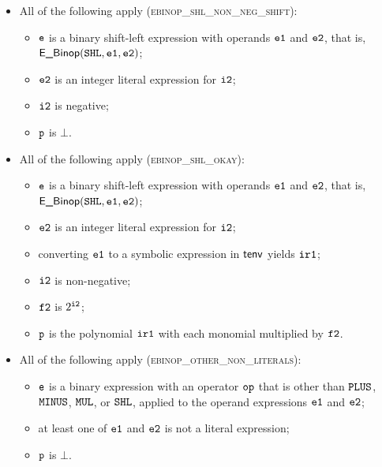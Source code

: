 \documentclass{book}
\begin{document}
\begin{itemize}
  \item All of the following apply (\textsc{ebinop\_shl\_non\_neg\_shift}):
  \begin{itemize}
    \item $\texttt{e}$ is a binary shift-left expression with operands $\texttt{e1}$ and $\texttt{e2}$, that is, \\ $\textsf{E\_Binop}(\texttt{SHL}, \texttt{e1}, \texttt{e2})$;
    \item $\texttt{e2}$ is an integer literal expression for $\texttt{i2}$;
    \item $\texttt{i2}$ is negative;
    \item $\texttt{p}$ is $\bot$.
  \end{itemize}

  \item All of the following apply (\textsc{ebinop\_shl\_okay}):
  \begin{itemize}
    \item $\texttt{e}$ is a binary shift-left expression with operands $\texttt{e1}$ and $\texttt{e2}$, that is, \\ $\textsf{E\_Binop}(\texttt{SHL}, \texttt{e1}, \texttt{e2})$;
    \item $\texttt{e2}$ is an integer literal expression for $\texttt{i2}$;
    \item converting $\texttt{e1}$ to a symbolic expression in $\textsf{tenv}$ yields $\texttt{ir1}$\ProseOrTypeErrorOrBot;
    \item $\texttt{i2}$ is non-negative;
    \item $\texttt{f2}$ is $2^{\texttt{i2}}$;
    \item $\texttt{p}$ is the polynomial $\texttt{ir1}$ with each monomial multiplied by $\texttt{f2}$.
  \end{itemize}

  \item All of the following apply (\textsc{ebinop\_other\_non\_literals}):
  \begin{itemize}
    \item $\texttt{e}$ is a binary expression with an operator $\texttt{op}$ that is other than $\texttt{PLUS}$, $\texttt{MINUS}$, $\texttt{MUL}$, or $\texttt{SHL}$,
          applied to the operand expressions $\texttt{e1}$ and $\texttt{e2}$;
    \item at least one of $\texttt{e1}$ and $\texttt{e2}$ is not a literal expression;
    \item $\texttt{p}$ is $\bot$.
  \end{itemize}


\end{itemize}
\end{document}
